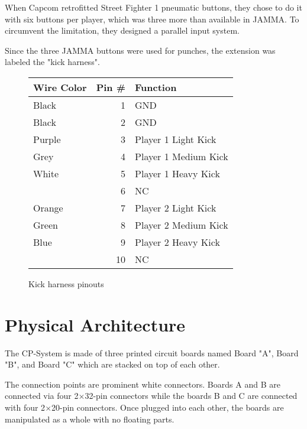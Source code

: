 When Capcom retrofitted Street Fighter 1 pneumatic buttons, they chose to do it with six buttons per player, which was three more than available in JAMMA. To circumvent the limitation, they designed a parallel input system. 

Since the three JAMMA buttons were used for punches, the extension was labeled the "kick harness".

\begin{figure}[H]

\begin{tabularx}{\textwidth}{lrX}
  \toprule    
  \textbf{Wire Color } & \textbf{ Pin \#}  & \textbf{Function } \\               
  \toprule   
  Black & 1 & GND \\
  Black & 2 & GND \\
  \toprule   
  Purple & 3 & Player 1 Light Kick \\
  Grey & 4 & Player 1 Medium Kick \\
  White & 5 & Player 1 Heavy Kick \\
  \toprule   
  & 6 & NC \\
  \toprule   
  Orange & 7 & Player 2 Light Kick\\
  Green & 8 & Player 2 Medium Kick\\
  Blue & 9 & Player 2 Heavy Kick\\
  \toprule   
  & 10 & NC \\
  \toprule   
\end{tabularx}
\caption*{Kick harness pinouts}
\end{figure}










  


\section{Physical Architecture}
 The CP-System is made of three printed circuit boards named Board "A", Board "B", and Board "C" which are stacked on top of each other.


\begin{figure}[H]
\centering
{}
\end{figure}

\pagebreak
The connection points are prominent white connectors. Boards A and B are connected via four 2$\times$32-pin connectors while the boards B and C are connected with four 2$\times$20-pin connectors.  Once plugged into each other, the boards are manipulated as a whole with no floating parts.


